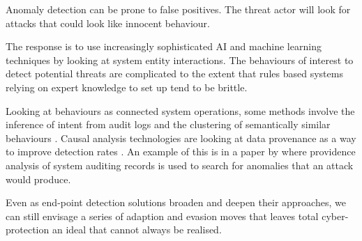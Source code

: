 Anomaly detection can be prone to false positives.  The threat actor will look for attacks that could look like innocent behaviour.

The response is to use increasingly sophisticated AI and machine learning techniques by looking at system entity interactions.  The behaviours
of interest to detect potential threats are complicated to the extent that rules based systems relying on expert knowledge to set up tend to
be brittle.

Looking at behaviours as connected system operations, some methods involve the inference of intent from audit logs
and the clustering of semantically similar behaviours \autocite{Zeng:2021}.
Causal analysis technologies are looking at data provenance as a way to improve detection rates \autocite{Inam:2023}.
An example of this is in a paper by \textcite{Zengy:2022} where providence analysis of system auditing records is used to
search for anomalies that an attack would produce.  


Even as end-point detection solutions broaden and deepen their approaches, we can still envisage a series of adaption and evasion moves that
leaves total cyber-protection an ideal that cannot always be realised. 













